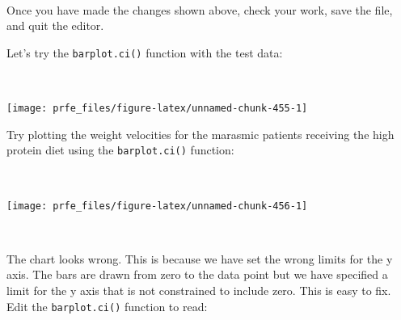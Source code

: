 \documentclass[12pt,a4paper]{book}
\newenvironment{Shaded}{\begin{snugshade}}{\end{snugshade}}
\newcommand{\KeywordTok}[1]{\textcolor[rgb]{0.13,0.29,0.53}{\textbf{#1}}}
\newcommand{\OperatorTok}[1]{\textcolor[rgb]{0.81,0.36,0.00}{\textbf{#1}}}
\newcommand{\NormalTok}[1]{#1}
\theoremstyle{definition}
\theoremstyle{definition}
\theoremstyle{definition}
\theoremstyle{remark}
\begin{document}
~

Once you have made the changes shown above, check your work, save the
file, and quit the editor.

Let's try the \texttt{barplot.ci()} function with the test data:

~

\begin{Shaded}
\end{Shaded}

\begin{center}\texttt{[image: prfe\_files/figure-latex/unnamed-chunk-455-1]} \end{center}

\newpage

Try plotting the weight velocities for the marasmic patients receiving
the high protein diet using the \texttt{barplot.ci()} function:

~

\begin{Shaded}
\end{Shaded}

\begin{center}\texttt{[image: prfe\_files/figure-latex/unnamed-chunk-456-1]} \end{center}

~

The chart looks wrong. This is because we have set the wrong limits for
the y axis. The bars are drawn from zero to the data point but we have
specified a limit for the y axis that is not constrained to include
zero. This is easy to fix. Edit the \texttt{barplot.ci()} function to
read:

~
\end{document}
